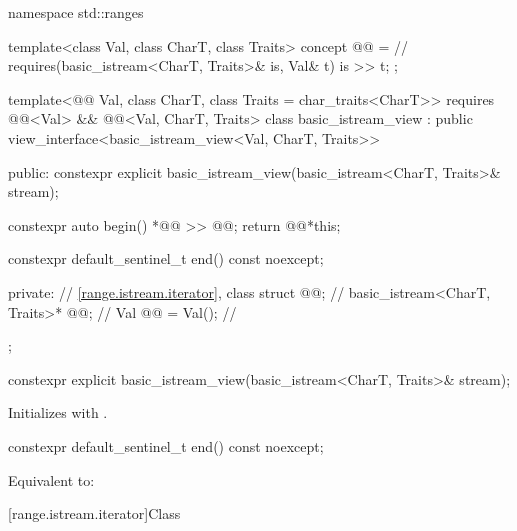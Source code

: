 %
\begin{codeblock}
namespace std::ranges {
  template<class Val, class CharT, class Traits>
    concept @@ =                // \expos
      requires(basic_istream<CharT, Traits>& is, Val& t) {
         is >> t;
      };

  template<@@ Val, class CharT, class Traits = char_traits<CharT>>
    requires @@<Val> &&
             @@<Val, CharT, Traits>
  class basic_istream_view : public view_interface<basic_istream_view<Val, CharT, Traits>> {
  public:
    constexpr explicit basic_istream_view(basic_istream<CharT, Traits>& stream);

    constexpr auto begin() {
      *@@ >> @@;
      return @@{*this};
    }

    constexpr default_sentinel_t end() const noexcept;

  private:
    // \ref{range.istream.iterator}, class 
    struct @@;                            // \expos
    basic_istream<CharT, Traits>* @@;      // \expos
    Val @@ = Val();                         // \expos
  };
}
\end{codeblock}

%
\begin{itemdecl}
constexpr explicit basic_istream_view(basic_istream<CharT, Traits>& stream);
\end{itemdecl}

\begin{itemdescr}
\pnum
\effects
Initializes  with .
\end{itemdescr}

%
\begin{itemdecl}
constexpr default_sentinel_t end() const noexcept;
\end{itemdecl}

\begin{itemdescr}
\pnum
\effects
Equivalent to: 
\end{itemdescr}

[range.istream.iterator]{Class }

